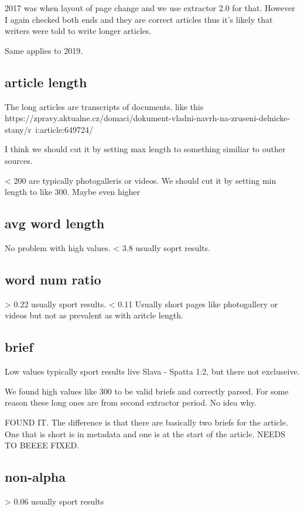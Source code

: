 \documentclass{article}
\begin{document}
     2017 was when layout of page change and we use extractor 2.0 for that. However I again checked both ends and they are correct articles thus it's likely that writers were told to write longer articles.

     Same applies to 2019.

    \subsection{article length}
    The long articles are transcripts of documents. like this https://zpravy.aktualne.cz/domaci/dokument-vladni-navrh-na-zruseni-delnicke-stany/r~i:article:649724/

    I think we should cut it by setting max length to something similiar to outher sources.

    < 200 are typically photogalleris or videos. We should cut it by setting min length to like 300. Maybe even higher

    \subsection{avg word length}
    No problem with high values. < 3.8 usually soprt results.

    \subsection{word num ratio}
    > 0.22 usually sport results. < 0.11 Usually short pages like photogallery or videos but not as prevalent as with aritcle length.

    \subsection{brief}
    Low values typically sport results live Slava - Spatta 1:2, but there not excluseive.

    We found high values like 300 to be valid briefs and correctly parsed. For some reason these long ones are from second extractor period. No idea why.

    FOUND IT. The difference is that there are basically two briefs for the article. One that is short is in metadata and one is at the start of the article. NEEDS TO BEEEE FIXED.

    \subsection{non-alpha}
    > 0.06 usually sport results
\end{document}
